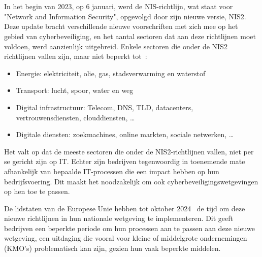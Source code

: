 
\chapter{}%
\label{ch:inleiding}

\section{}%
\label{sec:probleemstelling}

In het begin van 2023, op 6 januari, werd de NIS-richtlijn, wat staat voor "Network and Information Security", opgevolgd door zijn nieuwe versie, NIS2.
Deze update bracht verschillende nieuwe voorschriften met zich mee op het gebied van cyberbeveiliging, en het aantal sectoren dat aan deze richtlijnen moet voldoen, werd aanzienlijk uitgebreid.
Enkele sectoren die onder de NIS2 richtlijnen vallen zijn, maar niet beperkt tot~\autocite{NIS2Directive2022}:
\begin{itemize}
    \item Energie: elektriciteit, olie, gas, stadsverwarming en waterstof
    \item Transport: lucht, spoor, water en weg
    \item Digital infrastructuur: Telecom, DNS, TLD, datacenters, vertrouwensdiensten, clouddiensten, \ldots
    \item Digitale diensten: zoekmachines, online markten, sociale netwerken, \ldots
\end{itemize}

Het valt op dat de meeste sectoren die onder de NIS2-richtlijnen vallen, niet per se gericht zijn op IT.
Echter zijn bedrijven tegenwoordig in toenemende mate afhankelijk van bepaalde IT-processen die een impact hebben op hun bedrijfsvoering.
Dit maakt het noodzakelijk om ook cyberbeveiligingswetgevingen op hen toe te passen.

De lidstaten van de Europese Unie hebben tot oktober 2024~\autocite{NIS2Directive2022} de tijd om deze nieuwe richtlijnen in hun nationale wetgeving te implementeren.
Dit geeft bedrijven een beperkte periode om hun processen aan te passen aan deze nieuwe wetgeving, een uitdaging die vooral voor kleine of middelgrote ondernemingen (KMO's) problematisch kan zijn, gezien hun vaak beperkte middelen.

